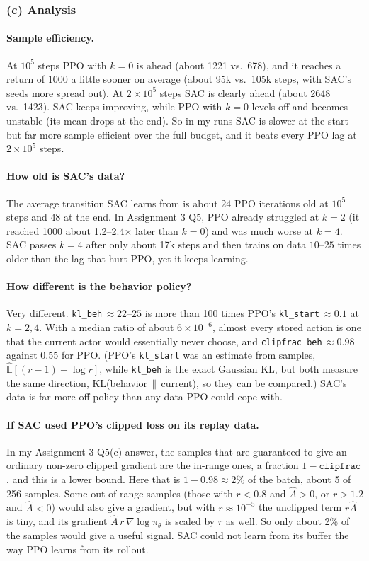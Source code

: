 \documentclass[11pt]{article}
\newcommand{\Ahat}{\hat{A}}
\newcommand{\Ehat}{\hat{\mathbb{E}}}
\newcommand{\code}[1]{\texttt{#1}}
\begin{document}
\subsubsection*{(c) Analysis}
\paragraph{Sample efficiency.} At $10^5$ steps PPO with $k=0$ is ahead (about 1221 vs.\ 678), and it
reaches a return of 1000 a little sooner on average (about 95k vs.\ 105k steps, with SAC's seeds more spread out).
At $2\times10^5$ steps SAC is clearly ahead (about 2648 vs.\ 1423). SAC keeps improving, while PPO with
$k=0$ levels off and becomes unstable (its mean drops at the end). So in my runs SAC is slower at the start
but far more sample efficient over the full budget, and it beats every PPO lag at $2\times10^5$ steps.

\paragraph{How old is SAC's data?} The average transition SAC learns from is about $24$ PPO
iterations old at $10^5$ steps and $48$ at the end. In Assignment 3 Q5, PPO already struggled at $k=2$
(it reached 1000 about 1.2--2.4$\times$ later than $k=0$) and was much worse at $k=4$. SAC passes $k=4$
after only about 17k steps and then trains on data $10$--$25$ times older than the lag that hurt PPO, yet
it keeps learning.

\paragraph{How different is the behavior policy?} Very different. \code{kl\_beh}$\,\approx22$--$25$ is
more than 100 times PPO's \code{kl\_start}$\,\approx0.1$ at $k=2,4$. With a median ratio of about
$6\times10^{-6}$, almost every stored action is one that the current actor would essentially never choose,
and \code{clipfrac\_beh}$\,\approx0.98$ against $0.55$ for PPO. (PPO's \code{kl\_start} was an estimate from
samples, $\Ehat[(r-1)-\log r]$, while \code{kl\_beh} is the exact Gaussian KL, but both measure the
same direction, KL(behavior$\,\|\,$current), so they can be compared.) SAC's data is far more
off-policy than any data PPO could cope with.

\paragraph{If SAC used PPO's clipped loss on its replay data.} In my Assignment 3 Q5(c) answer, the samples
that are guaranteed to give an ordinary non-zero clipped gradient are the in-range ones, a fraction
$1-\code{clipfrac}$, and this is a lower bound. Here that is $1-0.98\approx2\%$ of the batch, about 5
of 256 samples. Some out-of-range samples (those with $r<0.8$ and $\Ahat>0$, or $r>1.2$ and $\Ahat<0$) would also
give a gradient, but with $r\approx10^{-5}$ the unclipped term $r\Ahat$ is tiny, and its gradient
$\Ahat\,r\,\nabla\log\pi_\theta$ is scaled by $r$ as well. So only about 2\% of the samples would give a useful signal.
SAC could not learn from its buffer the way PPO learns from its rollout.
\end{document}
